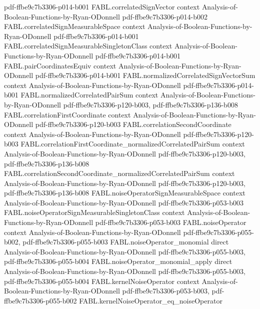 \begin{theorem}
  {pdf-ffbe9c7b3306-p014-b001}
\proofstep
  {FABL.correlatedSignVector}
  {context}
  {Analysis-of-Boolean-Functions-by-Ryan-ODonnell}
  {pdf-ffbe9c7b3306-p014-b002}
\proofstep
  {FABL.correlatedSignMeasurableSpace}
  {context}
  {Analysis-of-Boolean-Functions-by-Ryan-ODonnell}
  {pdf-ffbe9c7b3306-p014-b001}
\proofstep
  {FABL.correlatedSignMeasurableSingletonClass}
  {context}
  {Analysis-of-Boolean-Functions-by-Ryan-ODonnell}
  {pdf-ffbe9c7b3306-p014-b001}
\proofstep
  {FABL.pairCoordinatesEquiv}
  {context}
  {Analysis-of-Boolean-Functions-by-Ryan-ODonnell}
  {pdf-ffbe9c7b3306-p014-b001}
\proofstep
  {FABL.normalizedCorrelatedSignVectorSum}
  {context}
  {Analysis-of-Boolean-Functions-by-Ryan-ODonnell}
  {pdf-ffbe9c7b3306-p014-b001}
\proofstep
  {FABL.normalizedCorrelatedPairSum}
  {context}
  {Analysis-of-Boolean-Functions-by-Ryan-ODonnell}
  {pdf-ffbe9c7b3306-p120-b003,
    pdf-ffbe9c7b3306-p136-b008}
\proofstep
  {FABL.correlationFirstCoordinate}
  {context}
  {Analysis-of-Boolean-Functions-by-Ryan-ODonnell}
  {pdf-ffbe9c7b3306-p120-b003}
\proofstep
  {FABL.correlationSecondCoordinate}
  {context}
  {Analysis-of-Boolean-Functions-by-Ryan-ODonnell}
  {pdf-ffbe9c7b3306-p120-b003}
\proofstep
  {FABL.correlationFirstCoordinate_normalizedCorrelatedPairSum}
  {context}
  {Analysis-of-Boolean-Functions-by-Ryan-ODonnell}
  {pdf-ffbe9c7b3306-p120-b003,
    pdf-ffbe9c7b3306-p136-b008}
\proofstep
  {FABL.correlationSecondCoordinate_normalizedCorrelatedPairSum}
  {context}
  {Analysis-of-Boolean-Functions-by-Ryan-ODonnell}
  {pdf-ffbe9c7b3306-p120-b003,
    pdf-ffbe9c7b3306-p136-b008}
\proofstep
  {FABL.noiseOperatorSignMeasurableSpace}
  {context}
  {Analysis-of-Boolean-Functions-by-Ryan-ODonnell}
  {pdf-ffbe9c7b3306-p053-b003}
\proofstep
  {FABL.noiseOperatorSignMeasurableSingletonClass}
  {context}
  {Analysis-of-Boolean-Functions-by-Ryan-ODonnell}
  {pdf-ffbe9c7b3306-p053-b003}
\proofstep
  {FABL.noiseOperator}
  {context}
  {Analysis-of-Boolean-Functions-by-Ryan-ODonnell}
  {pdf-ffbe9c7b3306-p055-b002,
    pdf-ffbe9c7b3306-p055-b003}
\proofstep
  {FABL.noiseOperator_monomial}
  {direct}
  {Analysis-of-Boolean-Functions-by-Ryan-ODonnell}
  {pdf-ffbe9c7b3306-p055-b003,
    pdf-ffbe9c7b3306-p055-b004}
\proofstep
  {FABL.noiseOperator_monomial_apply}
  {direct}
  {Analysis-of-Boolean-Functions-by-Ryan-ODonnell}
  {pdf-ffbe9c7b3306-p055-b003,
    pdf-ffbe9c7b3306-p055-b004}
\proofstep
  {FABL.kernelNoiseOperator}
  {context}
  {Analysis-of-Boolean-Functions-by-Ryan-ODonnell}
  {pdf-ffbe9c7b3306-p053-b003,
    pdf-ffbe9c7b3306-p055-b002}
\proofstep
  {FABL.kernelNoiseOperator_eq_noiseOperator}

\end{theorem}
